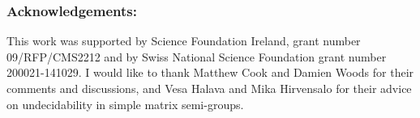\documentclass[11pt]{article} \usepackage{amsfonts,amsmath,amssymb,amsthm}
\begin{document}
\subsubsection*{Acknowledgements:}
This work was supported by Science Foundation Ireland, grant number 09/RFP/CMS2212 and by Swiss National Science Foundation grant number 200021-141029. I would like to thank Matthew Cook and Damien Woods for their comments and discussions, and Vesa Halava and Mika Hirvensalo for their advice on  undecidability in simple matrix semi-groups.



\end{document}
